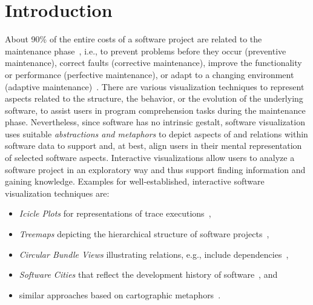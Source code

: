 \documentclass[runningheads]{llncs}
\begin{document}
\section{Introduction}
\label{sec:introduction}
About 90\thinspace{}\% of the entire costs of a software project are related to the maintenance phase~\cite{Dehaghani2013WhichMore}, i.e., to prevent problems before they occur (preventive maintenance), correct faults (corrective maintenance), improve the functionality or performance (perfective maintenance), or adapt to a changing environment (adaptive maintenance)~\cite{IEEESTD2017SEVocabulary}.
There are various visualization techniques to represent aspects related to the structure, the behavior, or the evolution of the underlying software, to assist users in program comprehension tasks during the maintenance phase.
Nevertheless, since software has no intrinsic gestalt, software visualization uses suitable \emph{abstractions and metaphors} to depict aspects of and relations within software data to support and, at best, align users in their mental representation of selected software aspects.
Interactive visualizations allow users to analyze a software project in an exploratory way and thus support finding information and gaining knowledge.
Examples for well-established, interactive software visualization techniques are:
\begin{itemize}
	\item \emph{Icicle Plots} for representations of trace executions~\cite{Malony1991Traceview,Cornelissen2011PCthroughTraceVisualization},
	\item \emph{Treemaps} depicting the hierarchical structure of software projects~\cite{scheibel2020-treemaptaxonomy,limberger2019-softwaremap},
	\item \emph{Circular Bundle Views} illustrating relations, e.g., include dependencies~\cite{bundleview},
	\item \emph{Software Cities} that reflect the development history of software~\cite{Steinbrueckner2010RepresentingDevelopmentHistory,steinbruckner2013-evolution}, and 
	\item similar approaches based on cartographic metaphors~\cite{hawes2015-codesurveyor,kuhn2010software}.
\end{itemize}
\end{document}
